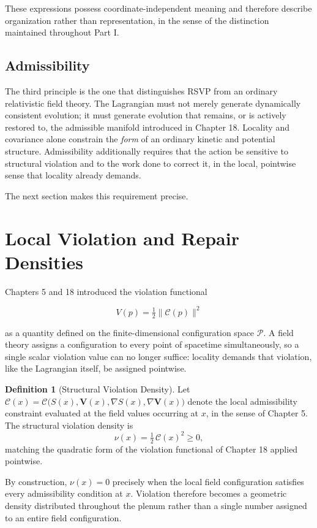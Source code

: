 \documentclass[11pt,oneside]{book}
\numberwithin{equation}{chapter}
\theoremstyle{definition}
\newtheorem{definition}{Definition}[chapter]
\theoremstyle{plain}
\begin{document}
These expressions possess coordinate-independent meaning and therefore
describe organization rather than representation, in the sense of the
distinction maintained throughout Part I.

\subsection*{Admissibility}

The third principle is the one that distinguishes RSVP from an ordinary
relativistic field theory. The Lagrangian must not merely generate
dynamically consistent evolution; it must generate evolution that remains,
or is actively restored to, the admissible manifold introduced in Chapter
18. Locality and covariance alone constrain the \emph{form} of an
ordinary kinetic and potential structure. Admissibility additionally
requires that the action be sensitive to structural violation and to the
work done to correct it, in the local, pointwise sense that locality already
demands.

The next section makes this requirement precise.

\section{Local Violation and Repair Densities}

Chapters 5 and 18 introduced the violation functional

\[
V(p)=\tfrac12\|\mathcal C(p)\|^2
\]

as a quantity defined on the finite-dimensional configuration space
\(\mathcal P\). A field theory assigns a configuration to every point of
spacetime simultaneously, so a single scalar violation value can no longer
suffice: locality demands that violation, like the Lagrangian itself, be
assigned pointwise.

\begin{definition}[Structural Violation Density]
Let \(\mathcal C(x)=\mathcal C\bigl(S(x),\mathbf V(x),\nabla S(x),\nabla
\mathbf V(x)\bigr)\) denote the local admissibility constraint evaluated at
the field values occurring at \(x\), in the sense of Chapter 5. The
structural violation density is
\[
\nu(x)
=
\tfrac12\,\mathcal C(x)^2
\ge 0,
\]
matching the quadratic form of the violation functional of Chapter 18
applied pointwise.
\end{definition}

By construction, \(\nu(x)=0\) precisely when the local field configuration
satisfies every admissibility condition at \(x\). Violation therefore
becomes a geometric density distributed throughout the plenum rather than a
single number assigned to an entire field configuration.
\end{document}
